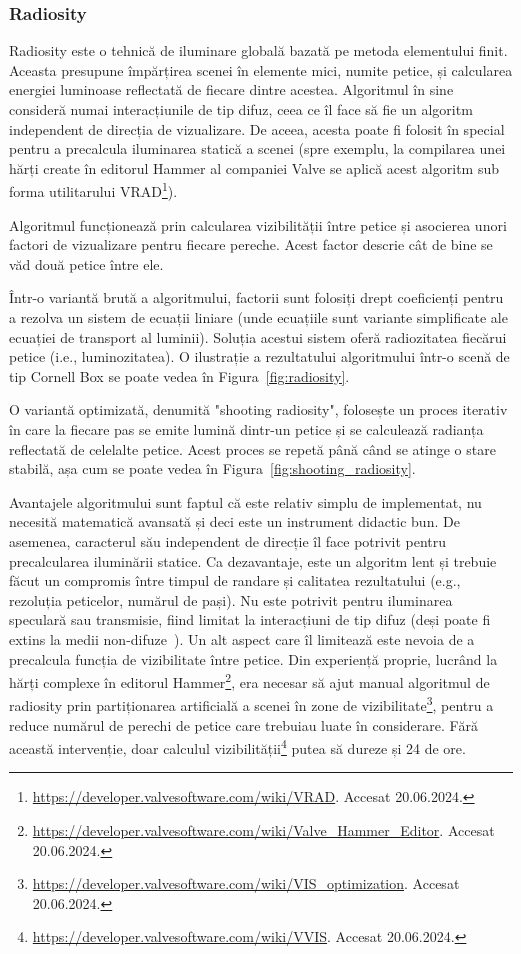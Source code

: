 \documentclass[12pt,a4paper]{report}
\numberwithin{equation}{section} %
\begin{document}
\subsubsection*{Radiosity}\label{sec:radiosity}
Radiosity este o tehnică de iluminare globală bazată pe metoda elementului finit.
Aceasta presupune împărțirea scenei în elemente mici, numite petice, și calcularea
energiei luminoase reflectată de fiecare dintre acestea. Algoritmul în sine consideră
numai interacțiunile de tip difuz, ceea ce îl face să fie un algoritm independent
de direcția de vizualizare. De aceea, acesta poate fi folosit în special pentru a precalcula
iluminarea statică a scenei (spre exemplu, la compilarea unei hărți create în editorul
Hammer al companiei Valve se aplică acest algoritm sub forma utilitarului VRAD\footnote{\url{https://developer.valvesoftware.com/wiki/VRAD}. Accesat 20.06.2024.}).

Algoritmul funcționează prin calcularea vizibilității între petice și asocierea
unori factori de vizualizare pentru fiecare pereche. Acest factor descrie
cât de bine se văd două petice între ele.

Într-o variantă brută a algoritmului, factorii sunt folosiți drept coeficienți pentru a rezolva
un sistem de ecuații liniare (unde ecuațiile sunt variante simplificate ale ecuației
de transport al luminii). Soluția acestui sistem oferă radiozitatea fiecărui petice
(i.e., luminozitatea). O ilustrație a rezultatului algoritmului într-o scenă
de tip Cornell Box se poate vedea în Figura~\ref{fig:radiosity}.

O variantă optimizată, denumită "shooting radiosity", folosește un proces iterativ în
care la fiecare pas se emite lumină dintr-un petice și se calculează radianța
reflectată de celelalte petice. Acest proces se repetă până când se atinge o stare
stabilă, așa cum se poate vedea în Figura~\ref{fig:shooting_radiosity}.

Avantajele algoritmului sunt faptul că este relativ simplu de implementat, nu necesită
matematică avansată și deci este un instrument didactic bun. De asemenea, caracterul
său independent de direcție îl face potrivit pentru precalcularea iluminării statice.
Ca dezavantaje, este un algoritm lent și trebuie făcut un compromis între timpul de
randare și calitatea rezultatului (e.g., rezoluția peticelor, numărul de pași). Nu este
potrivit pentru iluminarea speculară sau transmisie, fiind limitat la interacțiuni de tip difuz
(deși poate fi extins la medii non-difuze~\cite{Immel}).
Un alt aspect care îl limitează este nevoia de a precalcula funcția de vizibilitate între petice.
Din experiență proprie, lucrând la hărți complexe în editorul Hammer\footnote{\url{https://developer.valvesoftware.com/wiki/Valve_Hammer_Editor}. Accesat 20.06.2024.},
era necesar să ajut manual algoritmul de radiosity prin partiționarea artificială a
scenei în zone de vizibilitate\footnote{\url{https://developer.valvesoftware.com/wiki/VIS_optimization}. Accesat 20.06.2024.}, pentru a reduce numărul de perechi de petice care
trebuiau luate în considerare. Fără această intervenție, doar calculul vizibilității\footnote{\url{https://developer.valvesoftware.com/wiki/VVIS}. Accesat 20.06.2024.}
putea să dureze și 24 de ore.
\end{document}
